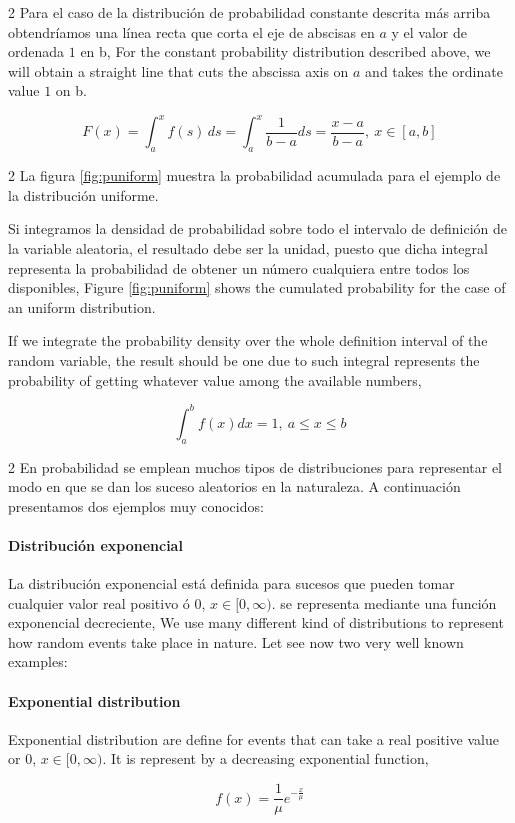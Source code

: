 \begin{paracol}{2}
Para el caso de la distribución de probabilidad constante descrita más arriba obtendríamos una línea recta que corta el eje de abscisas en $a$ y el valor de ordenada $1$ en b,
\switchcolumn
For the constant probability distribution described above, we will obtain a straight line that cuts the abscissa axis on $a$ and takes the ordinate value $1$ on b.
\end{paracol} 
\begin{equation*}
F(x) = \int_a^x f(s)\,ds = \int_a^x \frac{1}{b-a}ds = \frac{x-a}{b-a}, \ x \in[a,b]
\end{equation*}
\begin{paracol}{2}
La figura \ref{fig:puniform} muestra la probabilidad acumulada para el ejemplo de la distribución uniforme. 

Si integramos la densidad de probabilidad sobre todo el intervalo de definición de la variable aleatoria, el resultado debe ser la unidad, puesto que dicha integral representa la probabilidad de obtener un número cualquiera entre todos los disponibles,
\switchcolumn
Figure \ref{fig:puniform} shows the cumulated probability for the case of an uniform distribution.

If we integrate the probability density over the whole definition interval of the random variable, the result should be one due to such integral represents the probability of getting whatever value among the available numbers, 
\end{paracol}
\begin{equation*}
\int_a^b f(x)dx =1, \ a\leqslant x \leqslant b
\end{equation*}
\begin{paracol}{2}
En probabilidad se emplean muchos tipos de distribuciones para representar el modo en que se dan los suceso aleatorios en la naturaleza. A continuación presentamos dos ejemplos muy conocidos:

\paragraph{Distribución exponencial} 
La distribución exponencial está definida para sucesos que pueden tomar cualquier valor real positivo ó 0, $x \in [0,\infty)$. se representa mediante una función exponencial decreciente,
\switchcolumn
We use many different kind of distributions to represent how random events take place in nature. Let see now two very well known examples: 

\paragraph{Exponential distribution} 
Exponential distribution are define for events that can take a real positive value or $0$, $x\in [0,\infty)$. It is represent by a decreasing exponential function,
\end{paracol}
\begin{equation*}
f(x)=\frac{1}{\mu}e^{-\frac{x}{\mu}}
\end{equation*}

